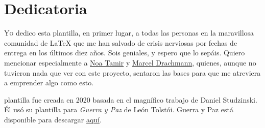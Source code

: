 \chapter*{Dedicatoria}

\lettrine[lines=2, loversize=0.3, lraise=0]{\initfamily Y}{o} dedico esta plantilla, en primer lugar, a todas las personas en la maravillosa comunidad de LaTeX que me han salvado de crisis nerviosas por fechas de entrega en los últimos diez años. Sois geniales, y espero que lo sepáis. Quiero mencionar especialmente a \href{http://www.noatamir.com/}{Noa Tamir} y \href{https://www.zib.de/de/members/drachmann}{Marcel Drachmann}, quienes, aunque no tuvieron nada que ver con este proyecto, sentaron las bases para que me atreviera a emprender algo como esto.

 plantilla fue creada en 2020 basada en el magnífico trabajo de Daniel Studzinski. Él usó su plantilla para \emph{Guerra y Paz} de León Tolstói. Guerra y Paz está disponible para descargar \href{https://www.overleaf.com/articles/war-and-peace/kdgcwgqzrrfd}{aquí}.
